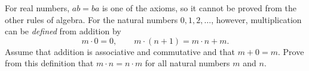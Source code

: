 For real numbers, $ab=ba$ is one of the axioms, so it cannot be proved from the other rules of algebra. For the natural numbers $0,1,2,\dots$, however, multiplication can be \emph{defined} from addition by
\[
m\cdot0=0,\qquad m\cdot(n+1)=m\cdot n+m .
\]
Assume that addition is associative and commutative and that $m+0=m$. Prove from this definition that $m\cdot n=n\cdot m$ for all natural numbers $m$ and $n$.
